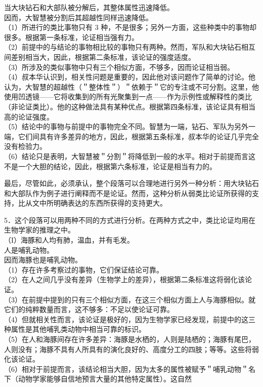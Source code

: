 当大块钻石和大部队被分解后，其整体属性迅速降低。\\
因而，大智慧被分割后其超越性同样迅速降低。\\
（1）所进行的类比事物只有 3 种，不是很多；另外一方面，这些种类中的事物却很多。根据第一条标准，论证相当强有力。\\
（2）前提中的与结论的事物相比较的事物只有两种。然而，军队和大块钻石相互间差别相当大，因此，根据第二条标准，该论证的强度适度。\\
（3）所涉及的类似事物中只有三个相似方面，不够多，因而论证相当弱。\\
（4）叔本华认识到，相关性问题是重要的，因此他对该问题作了简单的讨论。他认为，大智慧的超越性（＂整体性＂）＂依赖于＂它的专注或不可分割。这里，他使用凹透镜——它将收集到的所有光聚集到一点——作为示例性或解释性的类比（非论证类比）。他的这种做法具有某种优点。根据第四条标准，该论证具有相当高的论证强度。\\
（5）结论中的事物与前提中的事物完全不同。智慧为一端，钻石、军队为另外一端，它们间具有许多差异的地方，因此，根据第五条标准，叔本华的论证几乎完全没有检验力。\\
（6）结论只是表明，大智慧被＂分割＂将降低到一般的水平。相对于前提而言这不是一个大胆的结论，因此，根据第六条标准，论证是相当有力的。

最后，尽管如此，必须承认，整个段落可以合理地进行另外一种分析：用大块钻石和大部队作为例子进行阐释而不是论证。然而，这种分析从弱类比论证所获得的支持，比从文中所明确表达的东西所获得的支持更大。

5．这个段落可以用两种不同的方式进行分析。在两种方式之中，类比论证均用在生物学家的推理之中。\\
（I）海豚和人均有肺，温血，并有毛发。\\
人是哺乳动物。\\
因而海豚也是哺乳动物。\\
（1）存在许多考察过的事物，它们保证结论可靠。\\
（2）在人之间几乎没有差异（生物学上的差异），根据第二条标准这将弱化该论证。\\
（3）在前提中提到的只有三个相似方面，在这三个相似方面上人与海豚相似。就它们的纯粹数量而言，这不够多：不足以使论证可靠。\\
（4）但就相关性而言，该论证是极好的，因为生物学家已经发现，前提中的这三种属性是其他哺乳类动物中相当可靠的标识。\\
（5）在人和海豚间存在许多差异：海豚是水栖的，人则是陆栖的；海豚有尾巴，人则没有；海豚不具有人所具有的演化良好的、高度分工的四肢；等等。这些将弱化该论证。\\
（6）相对于前提而言，该结论相当大胆，因为太多的属性被赋予＂哺乳动物＂名下（动物学家能够自信地预言大量的其他特定属性）。这自然

